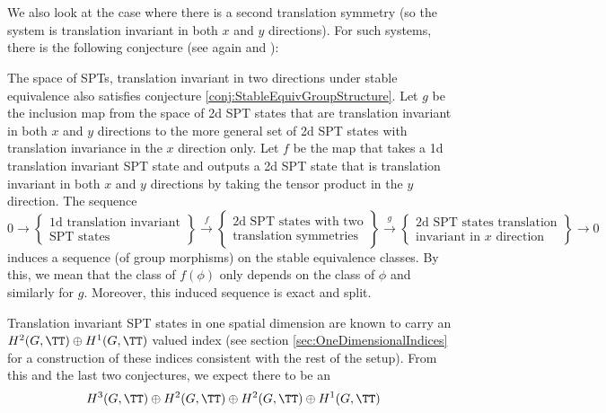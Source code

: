 \\\\
We also look at the case where there is a second translation symmetry (so the system is translation invariant in both $x$ and $y$ directions). For such systems, there is the following conjecture (see again \cite{xiong2019classification} and \cite{Chen_2013}):
\begin{conjecture}\label{conj2}
	The space of SPTs, translation invariant in two directions under stable equivalence also satisfies conjecture \ref{conj:StableEquivGroupStructure}. Let $g$ be the inclusion map from the space of 2d SPT states that are translation invariant in both $x$ and $y$ directions to the more general set of 2d SPT states with translation invariance in the $x$ direction only. Let $f$ be the map that takes a 1d translation invariant SPT state and outputs a 2d SPT state that is translation invariant in both $x$ and $y$ directions by taking the tensor product in the $y$ direction. The sequence
	\begin{equation}
		0\rightarrow\left\{\begin{matrix}\text{1d translation invariant}\\ \text{SPT states}\end{matrix}\right\}\stackrel{f}{\rightarrow}\left\{\begin{matrix}\text{2d SPT states with two}\\ \text{translation symmetries}\end{matrix}\right\}\stackrel{g}{\rightarrow}\left\{\begin{matrix}\text{2d SPT states translation}\\ \text{invariant in $x$ direction}\end{matrix}\right\}\rightarrow 0
	\end{equation}
	induces a sequence (of group morphisms) on the stable equivalence classes. By this, we mean that the class of $f(\phi)$ only depends on the class of $\phi$ and similarly for $g$. Moreover, this induced sequence is exact and split.
\end{conjecture}
Translation invariant SPT states in one spatial dimension are known to carry an $H^2(G,\TT)\oplus H^1(G,\TT)$ valued index (see section \ref{sec:OneDimensionalIndices} for a construction of these indices consistent with the rest of the setup). From this and the last two conjectures, we expect there to be an
\begin{equation}\label{eq:2TranslationsIntroduction}
	H^3(G,\TT)\oplus H^2(G,\TT)\oplus H^2(G,\TT)\oplus H^1(G,\TT)
\end{equation}
